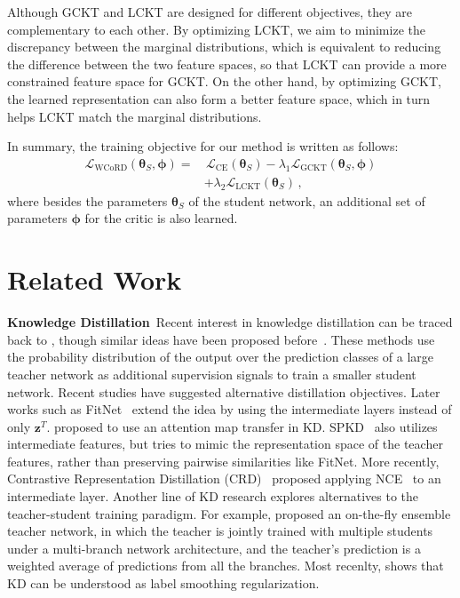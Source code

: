 \documentclass[final]{cvpr}
\newcommand{\zv}{{\boldsymbol z}}
\newcommand{\thetav}{{\boldsymbol \theta}}
\newcommand{\phiv}{{\boldsymbol \phi}}
\newcommand{\Lcal}{\mathcal{L}}
\theoremstyle{definition}
\begin{document}
Although GCKT and LCKT are designed for different objectives, they are complementary to each other. By optimizing LCKT, we aim to minimize the discrepancy between the marginal distributions, which is equivalent to reducing the difference between the two feature spaces, so that LCKT can provide a more constrained feature space for GCKT. On the other hand,
by optimizing GCKT, the learned representation can also form a better feature space, which in turn helps LCKT match the marginal distributions.

In summary, the training objective for our method is written as follows:
\begin{align}
\label{eq:wcord}
    \Lcal_{\mathrm{WCoRD}} (\thetav_S,\phiv) =& \, \Lcal_{\mathrm{CE}}(\thetav_S)-\lambda_1\Lcal_{\mathrm{GCKT}}(\thetav_S,\phiv) \nonumber\\
    &+ \lambda_2 \Lcal_{\mathrm{LCKT}}(\thetav_S) \,,
\end{align}
where besides the parameters $\thetav_S$ of the student network, an additional set of parameters $\phiv$ for the critic is also learned.











\section{Related Work}

\noindent\textbf{Knowledge Distillation}\,
Recent interest in knowledge distillation can be traced back to \cite{hinton2015distilling}, though similar ideas have been proposed before~\cite{zeng2000using, bucilua2006model}. 
These methods use the probability distribution of the output over the prediction classes of a large teacher network as additional supervision signals to train a smaller student network. 
Recent studies have suggested alternative distillation objectives.
Later works such as FitNet~\cite{romero2014fitnets} extend the idea by using the intermediate layers instead of only $\zv^T$. \cite{zagoruyko2016paying} proposed to use an attention map transfer in KD. SPKD~\cite{tung2019similarity} also utilizes intermediate features, but tries to mimic the representation space of the teacher features, rather than preserving pairwise similarities like FitNet.
More recently, Contrastive Representation Distillation (CRD)~\cite{tian2019contrastive} proposed applying NCE~\cite{gutmann2010noise} to an intermediate layer.
Another line of KD research explores alternatives to the teacher-student training paradigm. For example,
\cite{zhu2018knowledge} proposed an on-the-fly ensemble teacher network, in which the teacher is jointly trained with multiple students under a multi-branch network architecture, and the teacher's prediction is a weighted average of predictions from all the branches. Most recenlty, \cite{yuan2020revisiting} shows that KD can be understood as label smoothing regularization. 
\end{document}
